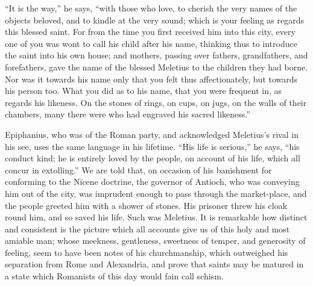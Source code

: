 ``It is the
way,'' he says, ``with those who love, to cherish the very names of
the objects beloved, and to kindle at the very sound; which is your
feeling as regards this blessed saint. For from the time you first
received him into this city, every one of you was wont to call his
child after his name, thinking thus to introduce the saint into his
own house; and mothers, passing over fathers, grandfathers, and
forefathers, gave the name of the blessed Meletius to the children
they had borne. Nor was it towards his name only that you felt thus
affectionately, but towards his person too. What you did as to his
name, that you were frequent in, as regards his likeness. On the
stones of rings, on cups, on jugs, on the walls of their chambers,
many there were who had engraved his sacred likeness.''

Epiphanius, who was of the Roman party, and
acknowledged Meletius's rival in his see, uses the same language in
his lifetime. ``His life is serious,'' he says, ``his conduct
kind; he is entirely loved by the people, on account of his life,
which all concur in extolling.'' We are told that, on occasion of his
banishment for conforming to the Nicene doctrine, the governor of
Antioch, who was conveying him out of the city, was imprudent enough
to pass through the market-place, and the people greeted him with a
shower of stones. His prisoner threw his cloak round him, and so saved
his life. Such was Meletius. It is remarkable how distinct and
consistent is the picture which all accounts give us of this holy and
most amiable man; whose meekness, gentleness, sweetness of temper, and
generosity of feeling, seem to have been notes of his churchmanship,
which outweighed his separation from Rome and Alexandria, and prove
that saints may be matured in a state which Romanists of this day
would fain call schism.

